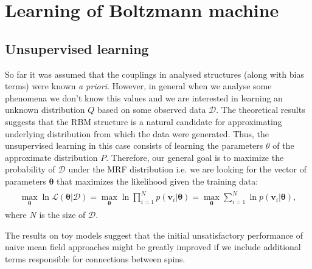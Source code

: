 \chapter{Learning of Boltzmann machine}
\section{Unsupervised learning}
So far it was assumed that the couplings in analysed structures (along with bias terms) were known \emph{a priori}. However, in general when we analyse some phenomena we don't know this values and we are interested in learning an unknown distribution $Q$ based on some observed data $\mathcal{D}$. The theoretical results suggests that the RBM structure is a natural candidate for approximating underlying distribution from which the data were generated. Thus, the unsupervised learning in this case consists of learning the parameters $\theta$ of the approximate distribution $P$. Therefore, our general goal is to maximize the probability of $\mathcal{D}$ under the MRF distribution i.e. we are looking for the vector of parameters $\mathbf{\theta}$ that maximizes the likelihood given the training data:
\begin{align}
\begin{split}
\max_{\mathbf{\theta}} \ln \mathcal{L}(\mathbf{\theta}| \mathcal{D}) = \max_{\mathbf{\theta}}  \ln \prod_{i=1}^N p(\mathbf{v}_i |\mathbf{\theta}) = \max_{\mathbf{\theta}} \sum_{i=1}^N \ln p(\mathbf{v}_i |\mathbf{\theta} ),
\end{split}
\end{align}
where $N$ is the size of $\mathcal{D}$. 

The results on toy models suggest that the initial unsatisfactory performance of naive mean field approaches \cite{tieleman2008training} might be greatly improved if we include additional terms responsible for connections between spins.

